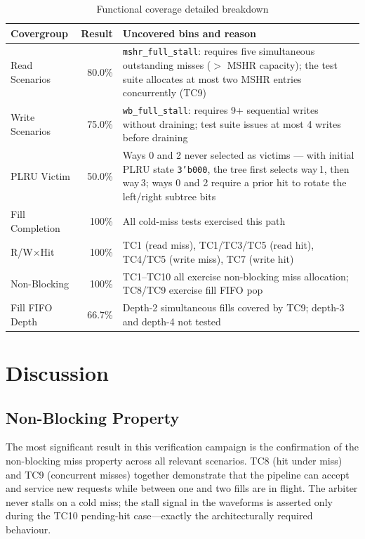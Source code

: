 \documentclass[12pt,letterpaper]{report}
\begin{document}
\begin{table}[htbp]
\centering
\caption{Functional coverage detailed breakdown}
\label{tab:coverage}
\begin{tabularx}{\linewidth}{@{}lrX@{}}
\toprule
Covergroup & Result & Uncovered bins and reason \\
\midrule
Read Scenarios    & 80.0\% & \texttt{mshr\_full\_stall}: requires five
                             simultaneous outstanding misses ($>$ MSHR
                             capacity); the test suite allocates at most
                             two MSHR entries concurrently (TC9) \\
Write Scenarios   & 75.0\% & \texttt{wb\_full\_stall}: requires 9+
                             sequential writes without draining; test
                             suite issues at most 4 writes before
                             draining \\
PLRU Victim       & 50.0\% & Ways 0 and 2 never selected as victims ---
                             with initial PLRU state \texttt{3'b000},
                             the tree first selects way\,1, then way\,3;
                             ways 0 and 2 require a prior hit to rotate
                             the left/right subtree bits \\
Fill Completion   & 100\%  & All cold-miss tests exercised this path \\
R/W$\times$Hit   & 100\%  & TC1 (read miss), TC1/TC3/TC5 (read hit),
                             TC4/TC5 (write miss), TC7 (write hit) \\
Non-Blocking      & 100\%  & TC1--TC10 all exercise non-blocking miss
                             allocation; TC8/TC9 exercise fill FIFO pop \\
Fill FIFO Depth   & 66.7\% & Depth-2 simultaneous fills covered by TC9;
                             depth-3 and depth-4 not tested \\
\bottomrule
\end{tabularx}
\end{table}

\section{Discussion}

\subsection{Non-Blocking Property}

The most significant result in this verification campaign is the
confirmation of the non-blocking miss property across all relevant
scenarios.  TC8 (hit under miss) and TC9 (concurrent misses) together
demonstrate that the pipeline can accept and service new requests
while between one and two fills are in flight.  The arbiter never
stalls on a cold miss; the stall signal in the waveforms is asserted
only during the TC10 pending-hit case---exactly the architecturally
required behaviour.
\end{document}
